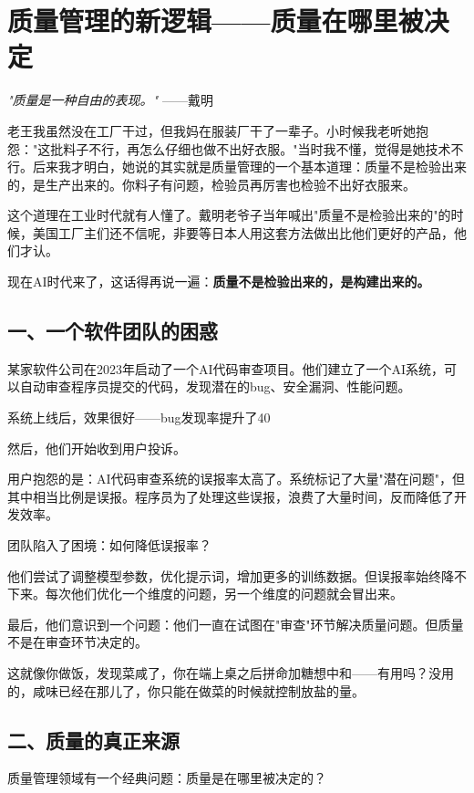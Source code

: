 \chapter{质量管理的新逻辑——质量在哪里被决定}


\textit{"质量是一种自由的表现。"}
——戴明


老王我虽然没在工厂干过，但我妈在服装厂干了一辈子。小时候我老听她抱怨："这批料子不行，再怎么仔细也做不出好衣服。"当时我不懂，觉得是她技术不行。后来我才明白，她说的其实就是质量管理的一个基本道理：质量不是检验出来的，是生产出来的。你料子有问题，检验员再厉害也检验不出好衣服来。

这个道理在工业时代就有人懂了。戴明老爷子当年喊出"质量不是检验出来的"的时候，美国工厂主们还不信呢，非要等日本人用这套方法做出比他们更好的产品，他们才认。

现在AI时代来了，这话得再说一遍：\textbf{质量不是检验出来的，是构建出来的。}

\section{一、一个软件团队的困惑}


某家软件公司在2023年启动了一个AI代码审查项目。他们建立了一个AI系统，可以自动审查程序员提交的代码，发现潜在的bug、安全漏洞、性能问题。

系统上线后，效果很好——bug发现率提升了40%

然后，他们开始收到用户投诉。

用户抱怨的是：AI代码审查系统的误报率太高了。系统标记了大量"潜在问题"，但其中相当比例是误报。程序员为了处理这些误报，浪费了大量时间，反而降低了开发效率。

团队陷入了困境：如何降低误报率？

他们尝试了调整模型参数，优化提示词，增加更多的训练数据。但误报率始终降不下来。每次他们优化一个维度的问题，另一个维度的问题就会冒出来。

最后，他们意识到一个问题：他们一直在试图在"审查"环节解决质量问题。但质量不是在审查环节决定的。

这就像你做饭，发现菜咸了，你在端上桌之后拼命加糖想中和——有用吗？没用的，咸味已经在那儿了，你只能在做菜的时候就控制放盐的量。

\section{二、质量的真正来源}


质量管理领域有一个经典问题：质量是在哪里被决定的？

